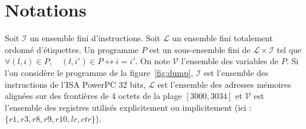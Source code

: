 \section{Notations}
\label{sec:reconstruction}
  

    Soit $\mathcal{I}$ un ensemble fini d'instructions.
    Soit $\mathcal{L}$ un ensemble fini totalement ordonné d'étiquettes.
    Un programme $P$ est un sous-ensemble fini de $\mathcal{L} \times \mathcal{I}$ tel que
    $\forall (l,i) \in P,\quad (l,i') \in P \leftrightarrow i = i'$.
    On note $\mathcal{V}$ l'ensemble des variables de $P$.     
    Si l'on considère le programme de la figure~\ref{fig:dump}, $\mathcal{I}$
    est l'ensemble des instructions de l'ISA PowerPC 32 bits,
    $\mathcal{L}$ est l'ensemble des adresses mémoires alignées sur des
    frontières de 4 octets de la plage $[3000, 3034]$ et $\mathcal{V}$ est
    l'ensemble des registres utilisés explicitement ou implicitement (ici :
    $\{r1, r3, r8, r9, r10, lr, ctr\}$).



    
